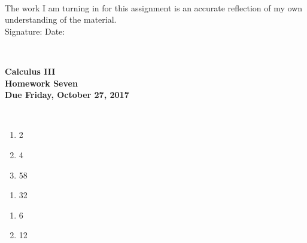\documentclass[12pt]{article}
\begin{document}
\\

\bigskip
\bigskip
\bigskip
\bigskip
\bigskip
\bigskip
\noindent The work I am turning in for this assignment is an accurate
reflection of my own understanding of the material.\\[14pt]

\noindent Signature: \underline{\hspace{7cm}} \hspace{1cm} Date:
\underline{\hspace{5cm}} 


\hspace{2mm}\\
\newpage



 
\begin{center}
{\large {\bf Calculus III}}\\
\medskip
{\large {\bf Homework Seven}}\\
\medskip
{ {\bf Due Friday, October 27, 2017}}\\
\end{center}

\hspace{2mm}\\

\begin{enumerate}
\setlength{\itemsep}{-1mm}
  \item 2
  \item 4
  \item 58
\end{enumerate}


\begin{enumerate}
\setlength{\itemsep}{-1mm}
  \item 32
\end{enumerate}


\begin{enumerate}
\setlength{\itemsep}{-1mm}
  \item 6
  \item 12
\end{enumerate}
\end{document}
